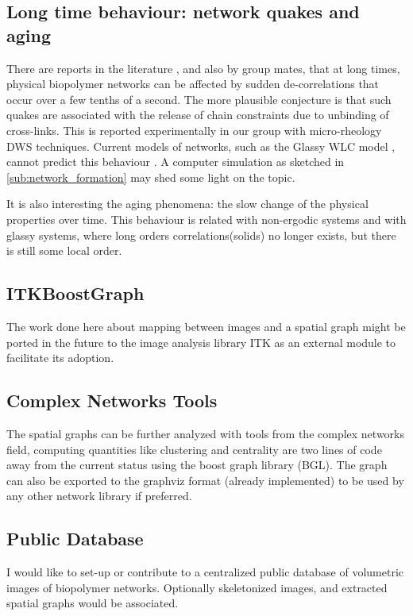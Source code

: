 \subsection{Long time behaviour: network quakes and aging}
\label{sub:quakes}
There are reports in the literature \citep{kajiya_slow_2013}, and also by group
mates\citep{vincent_micro-rheological_2013}, that at long times, physical
biopolymer networks can be affected by sudden de-correlations that occur over a
few tenths of a second. The more plausible conjecture is that such quakes are associated with the release of
chain constraints due to unbinding of cross-links.  This is reported
experimentally in our group  with micro-rheology DWS techniques.
Current models of networks, such as the Glassy WLC model
\citep{kroy_glassy_2007}, cannot predict this behaviour \citep{vincent_micro-rheological_2013}.  A
computer simulation as sketched in \autoref{sub:network_formation} may shed some light on the topic.

It is also interesting the aging phenomena: the slow change of the physical
properties over time. This behaviour is related with non-ergodic systems and
with glassy systems, where long orders correlations(solids) no longer exists,
but there is still some local order.\citep{cipelletti_slow_????}

\subsection{ITKBoostGraph}%
\label{sub:itkboostgraph}

  The work done here about mapping between images and a spatial graph might be ported in the future to the image analysis library ITK as an external module to facilitate its adoption.

\subsection{Complex Networks Tools}%
\label{sub:complex_networks_tools}

The spatial graphs can be further analyzed with tools from the complex networks field, computing quantities like clustering and centrality are two lines of code away from the current status using the boost graph library (BGL). The graph can also be exported to the graphviz format (already implemented) to be used by any other network library if preferred.

\subsection{Public Database}%
\label{sub:public_database}

  I would like to set-up or contribute to a centralized public database of volumetric images of biopolymer networks. Optionally skeletonized images, and extracted spatial graphs would be associated.

